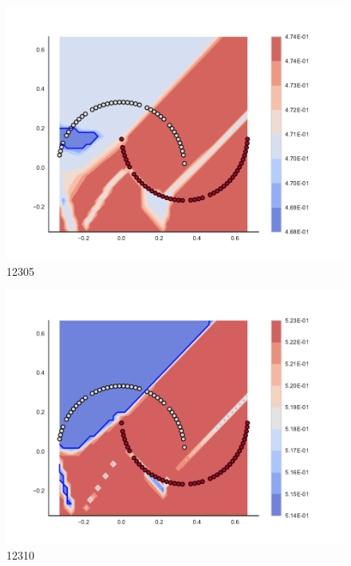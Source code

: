 \begin{subfigure}[b]{0.09\textwidth}
    \includegraphics[clip, trim=2.35cm 1.75cm 4.5cm 0cm,width=\textwidth]{img/convergence/12305.pdf}
    \caption{12305}
    \label{fig:convergence_12305}
\end{subfigure}
%
\begin{subfigure}[b]{0.09\textwidth}
    \includegraphics[clip, trim=2.35cm 1.75cm 4.5cm 0cm,width=\textwidth]{img/convergence/12310.pdf}
    \caption{12310}
    \label{fig:convergence_12310}
\end{subfigure}
%
